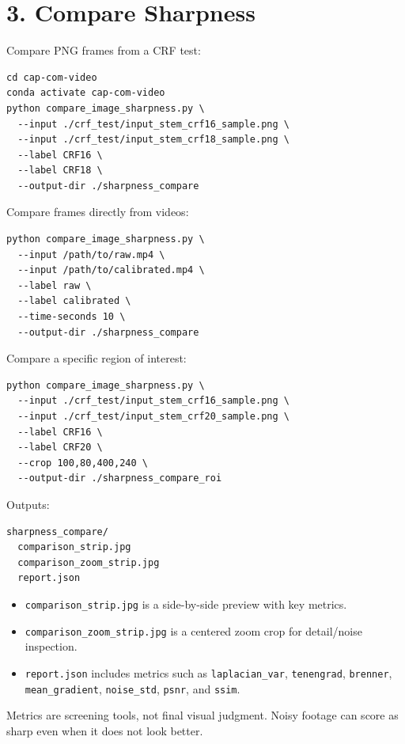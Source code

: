\documentclass[11pt,a4paper]{article}
\begin{document}
\section{3. Compare Sharpness}
Compare PNG frames from a CRF test:
\begin{verbatim}
cd cap-com-video
conda activate cap-com-video
python compare_image_sharpness.py \
  --input ./crf_test/input_stem_crf16_sample.png \
  --input ./crf_test/input_stem_crf18_sample.png \
  --label CRF16 \
  --label CRF18 \
  --output-dir ./sharpness_compare
\end{verbatim}
Compare frames directly from videos:
\begin{verbatim}
python compare_image_sharpness.py \
  --input /path/to/raw.mp4 \
  --input /path/to/calibrated.mp4 \
  --label raw \
  --label calibrated \
  --time-seconds 10 \
  --output-dir ./sharpness_compare
\end{verbatim}
Compare a specific region of interest:
\begin{verbatim}
python compare_image_sharpness.py \
  --input ./crf_test/input_stem_crf16_sample.png \
  --input ./crf_test/input_stem_crf20_sample.png \
  --label CRF16 \
  --label CRF20 \
  --crop 100,80,400,240 \
  --output-dir ./sharpness_compare_roi
\end{verbatim}
Outputs:
\begin{verbatim}
sharpness_compare/
  comparison_strip.jpg
  comparison_zoom_strip.jpg
  report.json
\end{verbatim}
\begin{itemize}
\item \texttt{comparison\_strip.jpg} is a side-by-side preview with key metrics.
\item \texttt{comparison\_zoom\_strip.jpg} is a centered zoom crop for detail/noise inspection.
\item \texttt{report.json} includes metrics such as \texttt{laplacian\_var}, \texttt{tenengrad}, \texttt{brenner}, \texttt{mean\_gradient}, \texttt{noise\_std}, \texttt{psnr}, and \texttt{ssim}.
\end{itemize}
Metrics are screening tools, not final visual judgment. Noisy footage can score as sharp even when it does not look better.
\end{document}
